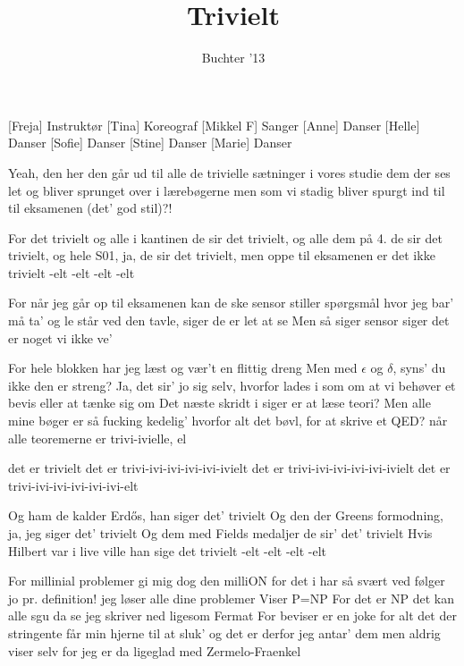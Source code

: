 \documentclass[a4paper,11pt]{article}
\title{Trivielt}
\author{Buchter '13}
\begin{document}
\maketitle

\begin{roles}
[Freja] Instruktør
[Tina] Koreograf
[Mikkel F] Sanger
[Anne] Danser
[Helle] Danser
[Sofie] Danser
[Stine] Danser
[Marie] Danser
\end{roles}

\begin{song}
 Yeah, den her den går ud til alle de trivielle sætninger i vores studie
dem der ses let og bliver sprunget over i lærebøgerne
men som vi stadig bliver spurgt ind til til eksamenen
(det' god stil)?!

 For det trivielt
og alle i kantinen de sir det trivielt,
og alle dem på 4. de sir det trivielt,
og hele S01, ja, de sir det trivielt,
men oppe til eksamenen er det ikke trivielt -elt -elt -elt -elt

 For når jeg går op til eksamenen kan de ske    
sensor stiller spørgsmål hvor jeg bar' må ta' og le
står ved den tavle, siger de er let at se
Men så siger sensor siger det er noget vi ikke ve'

 For hele blokken har jeg læst og vær't en flittig dreng
Men med $\epsilon$ og $\delta$, syns' du ikke den er streng?
Ja, det sir' jo sig selv, hvorfor lades i som om
at vi behøver et bevis eller at tænke sig om
Det næste skridt i siger er at læse teori?
Men alle mine bøger er så fucking kedelig'
hvorfor alt det bøvl, for at skrive et QED?
når alle teoremerne er trivi-ivielle, el

 det er trivielt
det er trivi-ivi-ivi-ivi-ivi-ivielt
det er trivi-ivi-ivi-ivi-ivi-ivielt
det er trivi-ivi-ivi-ivi-ivi-ivi-elt

 Og ham de kalder Erdős, han siger det' trivielt
Og den der Greens formodning, ja, jeg siger det' trivielt
Og dem med Fields medaljer de sir’ det’ trivielt
Hvis Hilbert var i live ville han sige det trivielt -elt -elt -elt -elt

 For millinial problemer gi mig dog den milliON
for det i har så svært ved følger jo pr. definition!
jeg løser alle dine problemer
Viser P=NP
For det er NP det kan alle sgu da se
jeg skriver ned ligesom Fermat
For beviser er en joke
for alt det der stringente får min hjerne til at sluk’
og det er derfor jeg antar’ dem men aldrig viser selv
for jeg er da ligeglad med Zermelo-Fraenkel


\end{song}
\end{document}
